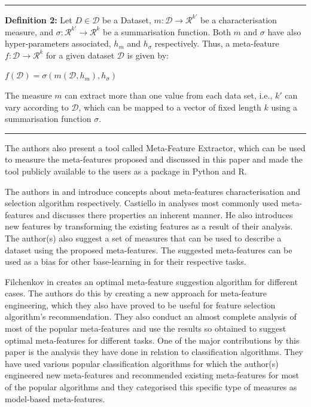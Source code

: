 \par\noindent\rule{\textwidth}{0.4pt}\newline
\textbf{Definition 2:} Let ${\displaystyle{D \in \mathcal{D} }}$ be a Dataset, ${\displaystyle{m: \mathcal{D} \to \mathcal{R}^{k'}}}$ be a characterisation measure, and $\displaystyle{\sigma: \mathcal{R}^{k'} \to \mathcal{R}^{k}}$ be a summarisation function. Both $\displaystyle{m}$ and $\sigma$ have also hyper-parameters associated, $h_m$ and $h_\sigma$ respectively. Thus, a meta-feature $\displaystyle{f: \mathcal{D} \to \mathcal{R}^{k}}$ for a given dataset $\displaystyle{\mathcal{D}}$ is given by:

\begin{center}
    $\displaystyle{f(\mathcal{D}) = \sigma(m(\mathcal{D}, h_m), h_\sigma)}$
\end{center}

The measure $\displaystyle{m}$ can extract more than one value from each data set, i.e., $\displaystyle{k'}$ can vary according to $\displaystyle{\mathcal{D}}$, which can be mapped to a vector of fixed length $\displaystyle{k}$ using a summarisation function $\displaystyle{\sigma}$.

\par\noindent\rule{\textwidth}{0.4pt}

The authors also present a tool called Meta-Feature Extractor, which can be used to measure the meta-features proposed and discussed in this paper and made the tool publicly available to the users as a package in Python and R.

The authors in \citep{meta-features-1} and \citep{meta-features-2} introduce concepts about meta-features characterisation and selection algorithm respectively. Castiello in \citep{meta-features-1} analyses most commonly used meta-features and discusses there properties an inherent manner. He also introduces new features by transforming the existing features as a result of their analysis. The author(s) also suggest a set of measures that can be used to describe a dataset using the proposed meta-features. The suggested meta-features can be used as a bias for other base-learning in for their respective tasks. 

Filchenkov in \citep{meta-features-2} creates an optimal meta-feature suggestion algorithm for different cases. The authors do this by creating a new approach for meta-feature engineering, which they also have proved to be useful for feature selection algorithm's recommendation. They also conduct an almost complete analysis of most of the popular meta-features and use the results so obtained to suggest optimal meta-features for different tasks. One of the major contributions by this paper is the analysis they have done in relation to classification algorithms. They have used various popular classification algorithms for which the author(s) engineered new meta-features and recommended existing meta-features for most of the popular algorithms and they categorised this specific type of measures as model-based meta-features.


